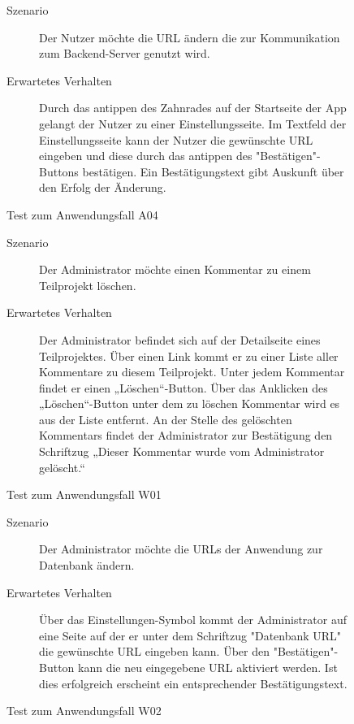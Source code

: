 \begin{figure}[!h]
	\begin{description}
	  \item[Szenario] Der Nutzer möchte die URL ändern die zur Kommunikation zum Backend-Server genutzt wird. 
	  \item[Erwartetes Verhalten] Durch das antippen des Zahnrades auf der Startseite der App gelangt der Nutzer zu einer Einstellungsseite. Im Textfeld der Einstellungsseite kann der Nutzer die gewünschte URL eingeben und diese durch das antippen des "Bestätigen"-Buttons bestätigen. Ein Bestätigungstext gibt Auskunft über den Erfolg der Änderung.
	\end{description}
	\caption{Test zum Anwendungsfall A04}
\end{figure}

\begin{figure}[!h]
	\begin{description}
	  \item[Szenario] Der Administrator möchte einen Kommentar zu einem Teilprojekt löschen.
	  \item[Erwartetes Verhalten] Der Administrator befindet sich auf der Detailseite eines Teilprojektes. Über einen Link kommt er zu einer Liste aller Kommentare zu diesem Teilprojekt. Unter jedem Kommentar findet er einen „Löschen“-Button. Über das Anklicken des „Löschen“-Button unter dem zu löschen Kommentar wird es aus der Liste entfernt. An der Stelle des gelöschten Kommentars findet der Administrator zur Bestätigung den Schriftzug „Dieser Kommentar wurde vom Administrator gelöscht.“
	\end{description}
	\caption{Test zum Anwendungsfall W01}
\end{figure}

\begin{figure}[!h]
	\begin{description}
	  \item[Szenario] Der Administrator möchte die URLs der Anwendung zur Datenbank ändern.
	  \item[Erwartetes Verhalten] Über das Einstellungen-Symbol kommt der Administrator auf eine Seite auf der er unter dem Schriftzug "Datenbank URL" die gewünschte URL eingeben kann. Über den "Bestätigen"-Button kann die neu eingegebene URL aktiviert werden. Ist dies erfolgreich erscheint ein entsprechender Bestätigungstext.  
	\end{description}
	\caption{Test zum Anwendungsfall W02}
\end{figure}